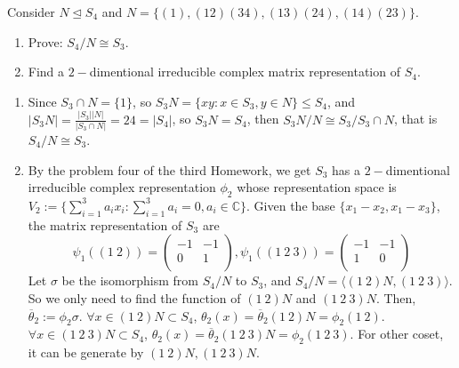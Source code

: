 \documentclass{ctexart}
\begin{document}
\begin{problem}\label{pro:2}
Consider $N\trianglelefteq S_4$ and $N=\{(1),(12)(34),(13)(24),(14)(23)\}$.
\begin{enumerate}
\item Prove: $S_4/N\cong S_3$.
\item Find a $2-$dimentional irreducible complex matrix representation of $S_4$.
\end{enumerate}
\end{problem}
\begin{solution}
    \begin{enumerate}
        \item Since $S_3\cap N=\{1\}$, so $S_3N=\{xy:x\in S_3, y\in N\}\le S_4$, and $|S_3N|=\frac{|S_3||N|}{|S_3\cap N|}=24=|S_4|$, so $S_3N=S_4$, then $S_3N/N\cong S_3/S_3\cap N$, that is $S_4/N\cong S_3$.
        \item By the problem four of the third Homework, we get $S_3$ has a $2-$dimentional irreducible complex representation $\phi_2$ whose representation space is $V_2:=\{\sum_{i=1}^3a_ix_i:\sum_{i=1}^3a_i=0,a_i\in \mathbb{C}\}$. Given the base $\{x_1-x_2,x_1-x_3\}$, the matrix representation of $S_3$ are 
        \begin{equation}
            \psi_1((1\ 2))=\left(\begin{array}{cc}
                -1 & -1\\
                0 & 1\\               
            \end{array}\right),
            \psi_1((1\ 2\ 3))=\left(\begin{array}{cc}
                -1 & -1\\
                1 & 0\\               
            \end{array}\right)
        \end{equation}
        Let $\sigma$ be the isomorphism from $S_4/N$ to $S_3$, and $S_4/N=\langle (1 \ 2)N, (1\ 2\ 3)\rangle$. So we only need to find the function of $(1\ 2)N$ and $(1\ 2\ 3)N$. Then, $\overline{\theta}_2:=\phi_2\sigma$. $\forall x\in(1\ 2)N\subset S_4$, $\theta_2(x)=\overline{\theta}_2(1\ 2)N=\phi_2(1\ 2)$. $\forall x\in(1\ 2\ 3)N\subset S_4$, $\theta_2(x)=\overline{\theta}_2(1\ 2\ 3)N=\phi_2(1\ 2\ 3)$. For other coset, it can be generate by $(1\ 2)N, (1\ 2\ 3)N$.
    \end{enumerate}
\end{solution}
\end{document}
